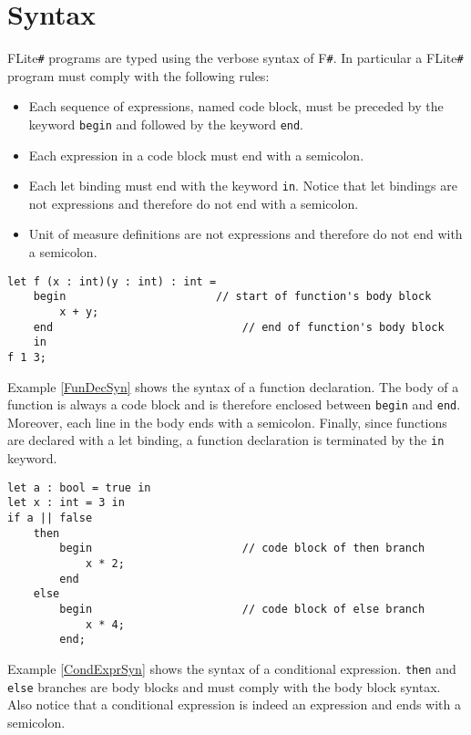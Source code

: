 \documentclass[]{article}
\begin{document}
	\section{Syntax}
		FLite\verb|#| programs are typed using the verbose syntax of F\verb|#|. In particular a FLite\verb|#| program must comply with the following rules:
		\begin{itemize}
			\item Each sequence of expressions, named code block, must be preceded by the keyword \lstinline|begin| and followed by the keyword \lstinline|end|.
			\item Each expression in a code block must end with a semicolon.
			\item Each let binding must end with the keyword \lstinline|in|. Notice that let bindings are not expressions and therefore do not end with a semicolon.
			\item Unit of measure definitions are not expressions and therefore do not end with a semicolon.
		\end{itemize}
		\begin{lstlisting}[caption={Function declaration syntax}, label=FunDecSyn]
let f (x : int)(y : int) : int =
	begin						// start of function's body block
		x + y;
	end								// end of function's body block
	in
f 1 3;
		\end{lstlisting}
	
		Example \ref{FunDecSyn} shows the syntax of a function declaration. The body of a function is always a code block and is therefore enclosed between \lstinline|begin| and \lstinline|end|. Moreover, each line in the body ends with a semicolon. Finally, since functions are declared with a let binding, a function declaration is terminated by the \lstinline|in| keyword.
		
		\begin{lstlisting}[caption={Conditional expression syntax}, label=CondExprSyn]
let a : bool = true in
let x : int = 3 in
if a || false
	then
		begin						// code block of then branch
			x * 2;
		end
	else
		begin						// code block of else branch
			x * 4;
		end;
		\end{lstlisting}
	
		Example \ref{CondExprSyn} shows the syntax of a conditional expression. \lstinline|then| and \lstinline|else| branches are body blocks and must comply with the body block syntax. Also notice that a conditional expression is indeed an expression and ends with a semicolon.
		
\end{document}
